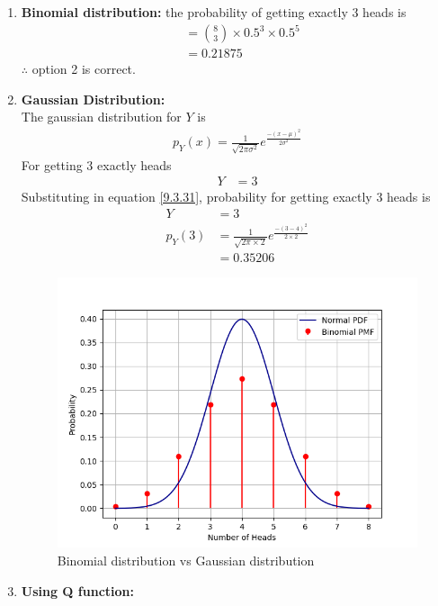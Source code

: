 \documentclass[journal,12pt,twocolumn]{IEEEtran}
\theoremstyle{remark}
\begin{document}
\begin{enumerate}
\item \textbf{Binomial distribution:} 
the probability of getting exactly 3 heads is 
\begin{align}
	&= \binom{8}{3} \times 0.5^3\times 0.5^{5}\\
	&= 0.21875
\end{align}
$\therefore$ option 2 is correct.\\
\item \textbf{Gaussian Distribution:}\\
The gaussian distribution for $Y$ is
\begin{align}
	p_Y(x) = \frac{1}{\sqrt{2\pi\sigma^2}}e^{\frac{-(x-\mu)^2}{2\sigma^2}}\label{9.3.31}
\end{align}
For getting 3 exactly heads
\begin{align}
	Y &= 3
\end{align}
Substituting in equation \eqref{9.3.31}, probability for getting exactly 3 heads is
\begin{align}
	Y &= 3\\
	p_Y(3) &= \frac{1}{\sqrt{2\pi\times2}}e^{\frac{-(3-4)^2}{2\times2}}\\
	&= 0.35206
\end{align}
\begin{figure}[H]
\includegraphics[width=\columnwidth]{./figs/fig.png}
\caption{Binomial distribution vs Gaussian distribution}
	\label{fig58:_9_3_31}
\end{figure}
\item \textbf{Using Q function:}
\begin{align}

\end{align}
\end{enumerate}
\end{document}
